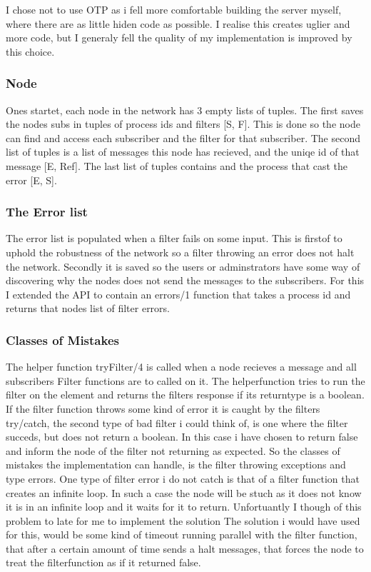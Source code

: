 \documentclass{article}
\begin{document}
I chose not to use OTP as i fell more comfortable building the server
myself, where there are as little hiden code as possible. I realise
this creates uglier and more code, but I generaly fell the quality
of my implementation is improved by this choice.

\subsubsection{Node}

Ones startet, each node in the network has 3 empty lists of tuples. 
The first saves the nodes subs in tuples of process ids and filters 
[{S, F}]. This is done so the node can find and access each 
subscriber and the filter for that subscriber. 
The second list of tuples is a list of messages this node has 
recieved, and the uniqe id of that message [{E, Ref]}. 
The last list of tuples contains and the process that cast the error [{E, S}].  

\subsubsection{The Error list}

The error list is populated when a filter fails on some input. This
is firstof to uphold the robustness of the network so a filter throwing an
error does not halt the network. Secondly it is saved so the users or adminstrators
have some way of discovering why the nodes does not send the
messages to the subscribers. For this I extended the API to contain
an errors/1 function that takes a process id and returns that nodes
list of filter errors.

\subsubsection{Classes of Mistakes}

The helper function tryFilter/4 is called when a node recieves a 
message and all subscribers Filter functions are to called on 
it. The helperfunction tries to run the filter on the element
and returns the filters response if its returntype is a boolean.
If the filter function throws some kind of error it is caught
by the filters try/catch, the second type of bad filter i could
think of, is one where the filter succeds, but does not return
a boolean. In this case i have chosen to return false and inform
the node of the filter not returning as expected.
So the classes of mistakes the implementation can handle, is the
filter throwing exceptions and type errors.
One type of filter error i do not catch is that of a filter 
function that creates an infinite loop. In such a case the
node will be stuch as it does not know it is in an infinite loop
and it waits for it to return. 
Unfortuantly I though of this problem to late for me to implement the solution
The solution i would have used for this, would be some kind of 
timeout running parallel with the filter function, that after a 
certain amount of time sends a halt messages, that forces the
node to treat the filterfunction as if it returned false. 
\end{document}
